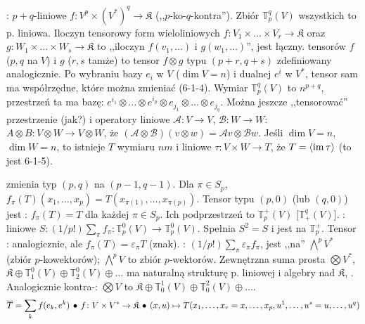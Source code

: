 :  $p+q$-liniowe $f \colon V^p \times (V^*)^q \to \mathfrak K$ (,,$p$-ko-$q$-kontra'').
Zbiór $\mathbb T_p^q(V)$ wszystkich to p. liniowa.
Iloczyn tensorowy form wieloliniowych $f \colon V_1 \times \dots \times V_r \to \mathfrak K$ oraz $g \colon W_1 \times \dots \times W_s \to \mathfrak K$ to ,,iloczyn $f(v_1, \dots)$ i $g(w_1, \dots)$'', jest łączny.
 tensorów $f$ ($p,q$ na $V$) i $g$ ($r,s$ tamże) to tensor $f \otimes g$ typu $(p+r, q+s)$ zdefiniowany analogicznie.
Po wybraniu bazy $e_i$ w $V$ ($\dim V = n$) i dualnej $e^i$ w $V^*$, tensor sam ma współrzędne, które można zmieniać (6-1-4).
Wymiar $\mathbb T_p^q(V)$ to $n^{p+q}$, przestrzeń ta ma bazę: $e^{i_1} \otimes \dots \otimes e^{i_p} \otimes e_{j_1} \otimes \dots \otimes e_{j_q}$.
Można jeszcze ,,tensorować'' przestrzenie (jak?) i operatory liniowe $\mathcal A \colon V \to V$, $\mathcal B \colon W \to W$: $A \otimes B \colon V \otimes W \to V \otimes W$, że $(\mathcal A \otimes \mathcal B) (v\otimes w) = \mathcal A v \otimes \mathcal B w$.
Jeśli $\dim V = n$, $\dim W = n$, to istnieje $T$ wymiaru $nm$ i liniowe $\tau \colon V \times W \to T$, że $T = \langle \operatorname{im} \tau \rangle$ (to jest 6-1-5).


  zmienia typ $(p,q)$ na $(p-1, q-1)$.
Dla $\pi \in S_p$, $f_\pi(T)(x_1, \dots, x_p) = T(x_{\pi(1)}, \dots, x_{\pi(p)})$.
Tensor typu $(p,0)$ (lub $(q,0)$) jest : $f_\pi(T) = T$ dla każdej $\pi \in S_p$.
Ich podprzestrzeń to $\mathbb T_p^+(V)$ [$\mathbb T_+^q(V)$].
: liniowe $S \colon (1/p!) \sum_{\pi} f_\pi \colon \mathbb T_p^0(V) \to \mathbb T_p^0(V)$.
Spełnia $S^2 = S$ i jest na $\mathbb T_p^+$.
Tensor : analogicznie, ale $f_\pi(T) = \varepsilon_\pi T$ (znak).
: $(1/p!) \sum_\pi \varepsilon_\pi f_\pi$, jest ,,na'' $\bigwedge^p V^*$ (zbiór $p$-kowektorów); $\bigwedge^p V$ to zbiór $p$-wektorów.
Zewnętrzna suma prosta $\bigotimes V^*$, $\mathfrak K \oplus \mathbb T_1^0(V) \oplus \mathbb T_2^0(V) \oplus \dots$ ma naturalną strukturę p. liniowej i algebry nad $\mathfrak K$, .
Analogicznie kontra-: $\bigotimes V$ to $\mathfrak K \oplus \mathbb T_0^1 (V) \oplus \mathbb T_0^2(V) \oplus \dots$.
\[
	\overline{T} = \sum_{k} f(e_k, e^k) \, \bullet \,
	f \colon V \times V^* \to \mathfrak K \, \bullet \,
	(x,u) \mapsto T(x_1, \dots, x_r = x, \dots, x_p, u^1, \dots, u^s = u, \dots, u^q)
\]

